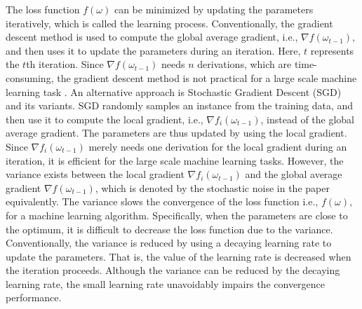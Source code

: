 \documentclass[preprint,review,11pt,a4paper]{elsarticle}
\begin{document}
The loss function $f(\omega)$ can be minimized by updating the parameters iteratively, which is called the learning process. Conventionally, the gradient descent method is used to compute the global average gradient, i.e., $\nabla f(\omega_{t-1})$, and then uses it to update the parameters during an iteration. Here, $t$ represents the $t$th iteration. Since $\nabla f(\omega_{t-1})$ needs $n$ derivations, which are time-consuming, the gradient descent method is not practical for a large scale machine learning task .  An alternative approach  is Stochastic  Gradient Descent (SGD) and its variants. SGD randomly samples an instance from the training data, and then use it to compute the local gradient, i.e., $\nabla f_i(\omega_{t-1})$, instead of the global average gradient.   The parameters are thus updated by using the local gradient. Since $\nabla f_i(\omega_{t-1})$ merely needs one derivation for the local gradient during an iteration,  it is efficient for the large scale machine learning tasks.  However, the variance exists between the local gradient $\nabla f_i(\omega_{t-1})$ and the global average gradient $\nabla f(\omega_{t-1})$, which is denoted by the stochastic noise in the paper equivalently. The variance  slows the convergence of the loss function i.e., $f(\omega)$, for a machine learning algorithm.  Specifically, when the parameters are close to the optimum, it is difficult to decrease the loss function due to the variance. Conventionally, the variance is reduced by using a decaying learning rate to update the parameters. That is,  the value of the learning rate is decreased when the iteration proceeds. Although the variance can be reduced by the decaying learning rate, the small learning rate unavoidably  impairs the convergence performance.
\end{document}
